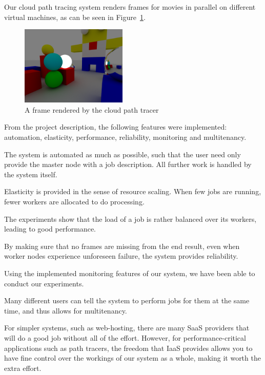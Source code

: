Our cloud path tracing system renders frames for movies in parallel on different virtual machines, as can be seen in Figure~\ref{fig:frame}.

\begin{figure}[ht!]
    \center
    \includegraphics[width=0.45\textwidth]{./img/frame.png}
    \caption{A frame rendered by the cloud path tracer}
    \label{fig:frame}
\end{figure}

From the project description\cite{projectdescription}, the following features were implemented: automation, elasticity, performance, reliability, monitoring and multitenancy.

The system is automated as much as possible, such that the user need only provide the master node with a job description.
All further work is handled by the system itself.

Elasticity is provided in the sense of resource scaling.
When few jobs are running, fewer workers are allocated to do processing.

The experiments show that the load of a job is rather balanced over its workers, leading to good performance.

By making sure that no frames are missing from the end result, even when worker nodes experience unforeseen failure, the system provides reliability.

Using the implemented monitoring features of our system, we have been able to conduct our experiments.

Many different users can tell the system to perform jobs for them at the same time, and thus allows for multitenancy.

For simpler systems, such as web-hosting, there are many SaaS providers that will do a good job without all of the effort.
However, for performance-critical applications such as path tracers, the freedom that IaaS provides allows you to have fine control over the workings of our system as a whole, making it worth the extra effort.